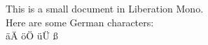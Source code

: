 \documentclass{article}
\begin{document}
This is a small document in Liberation Mono.
\\
Here are some German characters:
\\
äÄ öÖ üÜ ß
\end{document}
